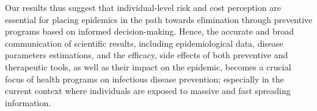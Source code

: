 Our results thus suggest that individual-level risk and cost perception are essential for placing epidemics in the path towards elimination through preventive programs based on informed decision-making. Hence, the accurate and broad communication of scientific results, including epidemiological data, disease parameters estimations, and the efficacy, side effects of both preventive and therapeutic tools, as well as their impact on the epidemic, becomes a crucial focus of health programs on infectious disease prevention; especially in the current context where individuals are exposed to massive and fast spreading information. 